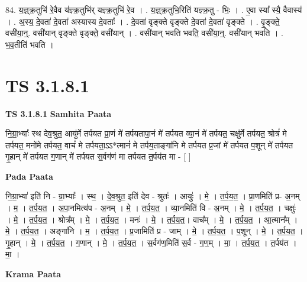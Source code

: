 \documentclass[17pt]{extarticle}
\begin{document}
84. य॒ज्ञ्॒क्र॒तुभि॑ रे॒वैव य॑ज्ञ्क्र॒तुभि॑र् यज्ञ्क्र॒तुभि॑ रे॒व । . य॒ज्ञ्॒क्र॒तुभि॒रिति॑ यज्ञ्क्र॒तु - भिः॒ । . ए॒वा स्या᳚ स्यै॒ वैवास्य॑ । . अ॒स्य॒ दे॒वता॑ दे॒वता॑ अस्यास्य दे॒वताः᳚ । . दे॒वता॑ वृङ्क्ते वृङ्क्ते दे॒वता॑ दे॒वता॑ वृङ्क्ते । . वृ॒ङ्क्ते॒ वसी॑या॒न्॒. वसी॑यान् वृङ्क्ते वृङ्क्ते॒ वसी॑यान् । . वसी॑यान् भवति भवति॒ वसी॑या॒न्॒. वसी॑यान् भवति । . भ॒व॒तीति॑ भवति । \newline
\pagebreak
{}

\section{ TS 3.1.8.1 }

\textbf{TS 3.1.8.1 } \newline
\textbf{Samhita Paata} \newline

नि॒ग्रा॒भ्याः᳚ स्थ देव॒श्रुत॒ आयु॑र्मे तर्पयत प्रा॒णं मे॑ तर्पयतापा॒नं मे॑ तर्पयत व्या॒नं मे॑ तर्पयत॒ चक्षु॑र्मे तर्पयत॒ श्रोत्रं॑ मे तर्पयत॒ मनो॑मे तर्पयत॒ वाचं॑ मे तर्पयता॒ऽऽ*त्मानं॑ मे तर्पय॒ताङ्गा॑नि मे तर्पयत प्र॒जां मे॑ तर्पयत प॒शून् मे॑ तर्पयत गृ॒हान् मे॑ तर्पयत ग॒णान् मे॑ तर्पयत स॒र्वग॑णं मा तर्पयत त॒र्पय॑त मा - [  ] \newline

\textbf{Pada Paata} \newline

नि॒ग्रा॒भ्या॑ इति॑ नि - ग्रा॒भ्याः᳚ । स्थ॒ । दे॒व॒श्रुत॒ इति॑ देव - श्रुतः॑ । आयुः॑ । मे॒ । त॒र्प॒य॒त॒ । प्रा॒णमिति॑ प्र- अ॒नम् । म॒ । त॒र्प॒य॒त॒ । अ॒पा॒नमित्य॑प - अ॒नम् । मे॒ । त॒र्प॒य॒त॒ । व्या॒नमिति॑ वि - अ॒नम् । मे॒ । त॒र्प॒य॒त॒ । चक्षुः॑ । मे॒ । त॒र्प॒य॒त॒ । श्रोत्र᳚म् । मे॒ । त॒र्प॒य॒त॒ । मनः॑ । मे॒ । त॒र्प॒य॒त॒। वाच᳚म् । मे॒ । त॒र्प॒य॒त॒ । आ॒त्मान᳚म् । मे॒ । त॒र्प॒य॒त॒ । अङ्गा॑नि । म॒ । त॒र्प॒य॒त॒ । प्र॒जामिति॑ प्र - जाम् । मे॒ । त॒र्प॒य॒त॒ । प॒शून् । मे॒ । त॒र्प॒य॒त॒ । गृ॒हान् । मे॒ । त॒र्प॒य॒त॒ । ग॒णान् । मे॒ । त॒र्प॒य॒त॒ । स॒र्वग॑ण॒मिति॑ स॒र्व - ग॒ण॒म् । मा॒ । त॒र्प॒य॒त॒ । त॒र्पय॑त । मा॒ ।  \newline


\textbf{Krama Paata} \newline
\end{document}
